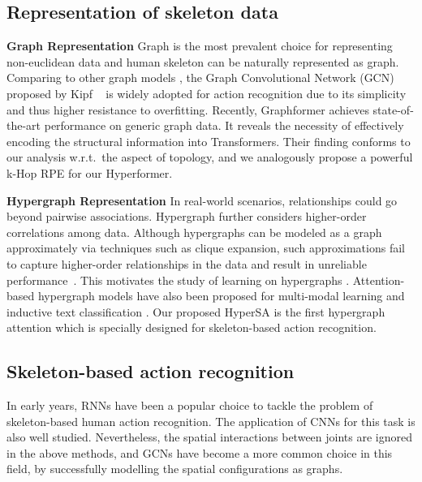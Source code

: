 \documentclass[10pt,twocolumn,letterpaper]{article}
\begin{document}
\subsection{Representation of skeleton data}
\noindent \textbf{Graph Representation} Graph is the most prevalent choice for representing non-euclidean data and human skeleton can be naturally represented as graph. 
Comparing to other graph models \cite{xu2018how, gilmer2017neural, velivckovic2017graph}, the Graph Convolutional Network (GCN) proposed by Kipf \etal~\cite{kipf2016semi} is widely adopted for action recognition due to its simplicity and thus higher resistance to overfitting.
Recently, Graphformer \cite{ying2021transformers} achieves state-of-the-art performance on generic graph data. It reveals the necessity of effectively encoding
the structural information into Transformers. Their finding conforms to our analysis w.r.t.~the aspect of topology, and we analogously propose a powerful k-Hop RPE for our Hyperformer.   

\noindent \textbf{Hypergraph Representation} In real-world scenarios,
relationships could go beyond pairwise associations. Hypergraph further considers higher-order correlations among data. Although hypergraphs can be modeled as
a graph approximately via techniques such as clique expansion\cite{zhou2006learning}, such approximations fail to capture higher-order relationships in the data and result
in unreliable performance~\cite{chien2019hs, li2017inhomogeneous}.
This motivates
the study of learning on hypergraphs \cite{hein2013total, zhang2017re, feng2019hypergraph, yadati2019hypergcn}. Attention-based hypergraph models have also been proposed for multi-modal learning \cite{kim2020hypergraph} and inductive text classification \cite{ding2020more}. Our proposed HyperSA is the first hypergraph attention which is specially designed for skeleton-based action recognition.

\subsection{Skeleton-based action recognition}
In early years, RNNs \cite{du2015hierarchical, song2017end,zhang2017view}
have been a popular choice to tackle the problem of skeleton-based human action recognition.
The application of CNNs for this task 
\cite{ke2017a, liu2017enhanced}
is also well studied.  
Nevertheless, the spatial interactions between joints are ignored in the above methods, 
and GCNs have become a more common choice in this field, by successfully modelling the spatial configurations
as graphs. 
\end{document}
